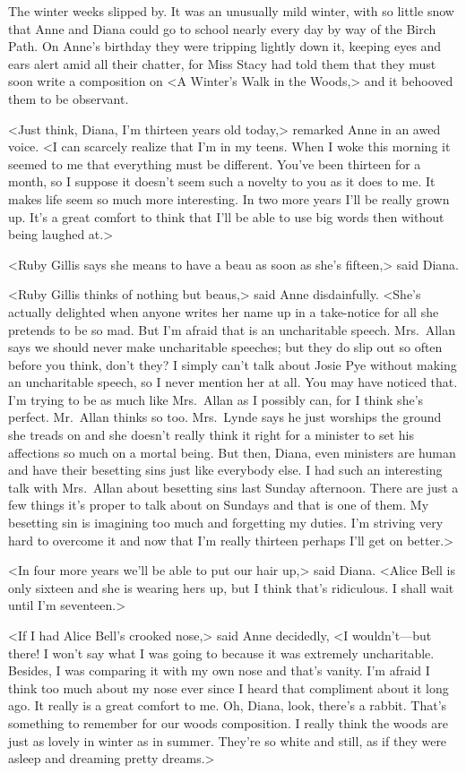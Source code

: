 The winter weeks slipped by. It was an unusually mild winter, with so little snow that Anne and Diana could go to school nearly every day by way of the Birch Path. On Anne's birthday they were tripping lightly down it, keeping eyes and ears alert amid all their chatter, for Miss Stacy had told them that they must soon write a composition on <A Winter's Walk in the Woods,> and it behooved them to be observant.

<Just think, Diana, I'm thirteen years old today,> remarked Anne in an awed voice. <I can scarcely realize that I'm in my teens. When I woke this morning it seemed to me that everything must be different. You've been thirteen for a month, so I suppose it doesn't seem such a novelty to you as it does to me. It makes life seem so much more interesting. In two more years I'll be really grown up. It's a great comfort to think that I'll be able to use big words then without being laughed at.>

<Ruby Gillis says she means to have a beau as soon as she's fifteen,> said Diana.

<Ruby Gillis thinks of nothing but beaus,> said Anne disdainfully. <She's actually delighted when anyone writes her name up in a take-notice for all she pretends to be so mad. But I'm afraid that is an uncharitable speech. Mrs.~Allan says we should never make uncharitable speeches; but they do slip out so often before you think, don't they? I simply can't talk about Josie Pye without making an uncharitable speech, so I never mention her at all. You may have noticed that. I'm trying to be as much like Mrs.~Allan as I possibly can, for I think she's perfect. Mr.~Allan thinks so too. Mrs.~Lynde says he just worships the ground she treads on and she doesn't really think it right for a minister to set his affections so much on a mortal being. But then, Diana, even ministers are human and have their besetting sins just like everybody else. I had such an interesting talk with Mrs.~Allan about besetting sins last Sunday afternoon. There are just a few things it's proper to talk about on Sundays and that is one of them. My besetting sin is imagining too much and forgetting my duties. I'm striving very hard to overcome it and now that I'm really thirteen perhaps I'll get on better.>

<In four more years we'll be able to put our hair up,> said Diana. <Alice Bell is only sixteen and she is wearing hers up, but I think that's ridiculous. I shall wait until I'm seventeen.>

<If I had Alice Bell's crooked nose,> said Anne decidedly, <I wouldn't—but there! I won't say what I was going to because it was extremely uncharitable. Besides, I was comparing it with my own nose and that's vanity. I'm afraid I think too much about my nose ever since I heard that compliment about it long ago. It really is a great comfort to me. Oh, Diana, look, there's a rabbit. That's something to remember for our woods composition. I really think the woods are just as lovely in winter as in summer. They're so white and still, as if they were asleep and dreaming pretty dreams.>

